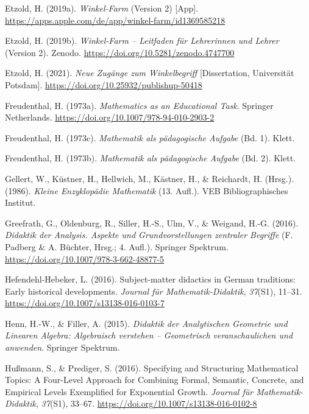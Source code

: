 \documentclass[
]{scrbook}
\newlength{\cslhangindent}
\newenvironment{CSLReferences}[2] %
 {\begin{list}{}{%
  \setlength{\itemindent}{0pt}
  \setlength{\leftmargin}{0pt}
  \setlength{\parsep}{0pt}
  \ifodd #1
   \setlength{\leftmargin}{\cslhangindent}
   \setlength{\itemindent}{-1\cslhangindent}
  \fi
  \setlength{\itemsep}{#2\baselineskip}}}
 {\end{list}}
\theoremstyle{definition}
\theoremstyle{definition}
\theoremstyle{definition}
\theoremstyle{definition}
\theoremstyle{remark}
\begin{document}
\begin{CSLReferences}{1}{0}
Etzold, H. (2019a). \emph{Winkel-{Farm}} (Version 2) {[}App{]}. \url{https://apps.apple.com/de/app/winkel-farm/id1369585218}

Etzold, H. (2019b). \emph{Winkel-{Farm} -- {Leitfaden} für {Lehrerinnen} und {Lehrer}} (Version 2). Zenodo. \url{https://doi.org/10.5281/zenodo.4747700}

Etzold, H. (2021). \emph{Neue Zugänge zum Winkelbegriff} {[}Dissertation, Universität Potsdam{]}. \url{https://doi.org/10.25932/publishup-50418}

Freudenthal, H. (1973a). \emph{Mathematics as an {Educational} {Task}}. Springer Netherlands. \url{https://doi.org/10.1007/978-94-010-2903-2}

Freudenthal, H. (1973c). \emph{Mathematik als pädagogische {Aufgabe}} (Bd. 1). Klett.

Freudenthal, H. (1973b). \emph{Mathematik als pädagogische {Aufgabe}} (Bd. 2). Klett.

Gellert, W., Küstner, H., Hellwich, M., Kästner, H., \& Reichardt, H. (Hrsg.). (1986). \emph{Kleine {Enzyklopädie} {Mathematik}} (13. Aufl.). VEB Bibliographisches Institut.

Greefrath, G., Oldenburg, R., Siller, H.-S., Ulm, V., \& Weigand, H.-G. (2016). \emph{Didaktik der {Analysis}. {Aspekte} und {Grundvorstellungen} zentraler {Begriffe}} (F. Padberg \& A. Büchter, Hrsg.; 4. Aufl.). Springer Spektrum. \url{https://doi.org/10.1007/978-3-662-48877-5}

Hefendehl-Hebeker, L. (2016). Subject-matter didactics in {German} traditions: {Early} historical developments. \emph{Journal für Mathematik-Didaktik}, \emph{37}(S1), 11--31. \url{https://doi.org/10.1007/s13138-016-0103-7}

Henn, H.-W., \& Filler, A. (2015). \emph{Didaktik der {Analytischen} {Geometrie} und {Linearen} {Algebra}: {Algebraisch} verstehen -- {Geometrisch} veranschaulichen und anwenden}. Springer Spektrum.

Hußmann, S., \& Prediger, S. (2016). Specifying and Structuring Mathematical Topics: A Four-Level Approach for Combining Formal, Semantic, Concrete, and Empirical Levels Exemplified for Exponential Growth. \emph{Journal für Mathematik-Didaktik}, \emph{37}(S1), 33--67. \url{https://doi.org/10.1007/s13138-016-0102-8}


\end{CSLReferences}
\end{document}
